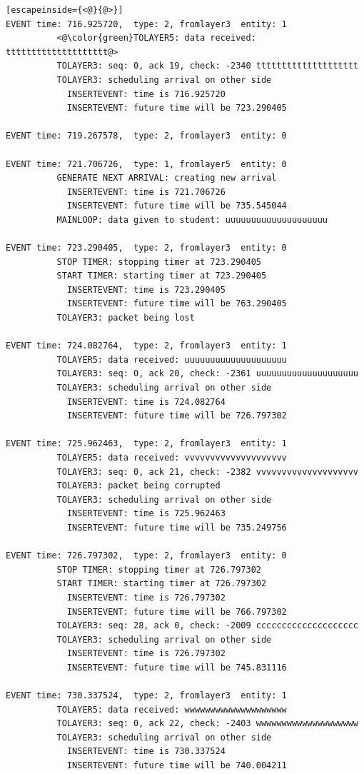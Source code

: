 \documentclass[paper=a4, fontsize=11pt]{scrartcl}
\numberwithin{equation}{section}		%
\numberwithin{figure}{section}			%
\numberwithin{table}{section}				%
\begin{document}
\begin{lstlisting}[escapeinside={<@}{@>}]
EVENT time: 716.925720,  type: 2, fromlayer3  entity: 1
          <@\color{green}TOLAYER5: data received: tttttttttttttttttttt@>
          TOLAYER3: seq: 0, ack 19, check: -2340 tttttttttttttttttttt
          TOLAYER3: scheduling arrival on other side
            INSERTEVENT: time is 716.925720
            INSERTEVENT: future time will be 723.290405

EVENT time: 719.267578,  type: 2, fromlayer3  entity: 0

EVENT time: 721.706726,  type: 1, fromlayer5  entity: 0
          GENERATE NEXT ARRIVAL: creating new arrival
            INSERTEVENT: time is 721.706726
            INSERTEVENT: future time will be 735.545044
          MAINLOOP: data given to student: uuuuuuuuuuuuuuuuuuuu

EVENT time: 723.290405,  type: 2, fromlayer3  entity: 0
          STOP TIMER: stopping timer at 723.290405
          START TIMER: starting timer at 723.290405
            INSERTEVENT: time is 723.290405
            INSERTEVENT: future time will be 763.290405
          TOLAYER3: packet being lost

EVENT time: 724.082764,  type: 2, fromlayer3  entity: 1
          TOLAYER5: data received: uuuuuuuuuuuuuuuuuuuu
          TOLAYER3: seq: 0, ack 20, check: -2361 uuuuuuuuuuuuuuuuuuuu
          TOLAYER3: scheduling arrival on other side
            INSERTEVENT: time is 724.082764
            INSERTEVENT: future time will be 726.797302

EVENT time: 725.962463,  type: 2, fromlayer3  entity: 1
          TOLAYER5: data received: vvvvvvvvvvvvvvvvvvvv
          TOLAYER3: seq: 0, ack 21, check: -2382 vvvvvvvvvvvvvvvvvvvv
          TOLAYER3: packet being corrupted
          TOLAYER3: scheduling arrival on other side
            INSERTEVENT: time is 725.962463
            INSERTEVENT: future time will be 735.249756

EVENT time: 726.797302,  type: 2, fromlayer3  entity: 0
          STOP TIMER: stopping timer at 726.797302
          START TIMER: starting timer at 726.797302
            INSERTEVENT: time is 726.797302
            INSERTEVENT: future time will be 766.797302
          TOLAYER3: seq: 28, ack 0, check: -2009 cccccccccccccccccccc
          TOLAYER3: scheduling arrival on other side
            INSERTEVENT: time is 726.797302
            INSERTEVENT: future time will be 745.831116

EVENT time: 730.337524,  type: 2, fromlayer3  entity: 1
          TOLAYER5: data received: wwwwwwwwwwwwwwwwwwww
          TOLAYER3: seq: 0, ack 22, check: -2403 wwwwwwwwwwwwwwwwwwww
          TOLAYER3: scheduling arrival on other side
            INSERTEVENT: time is 730.337524
            INSERTEVENT: future time will be 740.004211


\end{lstlisting}
\end{document}
